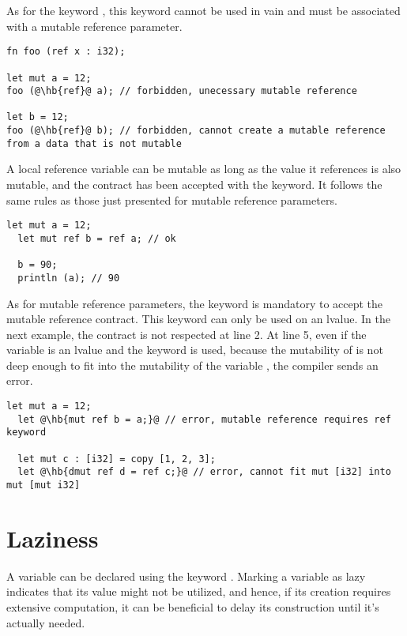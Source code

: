 As for the keyword , this keyword  cannot be used in
vain and must be associated with a mutable reference parameter.

\begin{lstlisting}[style=coloredverbatim, escapechar=@]
fn foo (ref x : i32);

let mut a = 12;
foo (@\hb{ref}@ a); // forbidden, unecessary mutable reference

let b = 12;
foo (@\hb{ref}@ b); // forbidden, cannot create a mutable reference from a data that is not mutable
\end{lstlisting}

A local reference variable can be mutable as long as the value it references is
also mutable, and the contract has been accepted with the  keyword.
It follows the same rules as those just presented for mutable reference
parameters.

\begin{lstlisting}[style=coloredverbatim, escapechar=@]
  let mut a = 12;
  let mut ref b = ref a; // ok

  b = 90;
  println (a); // 90
\end{lstlisting}

As for mutable reference parameters, the keyword  is mandatory to
accept the mutable reference contract. This keyword can only be used on an
lvalue. In the next example, the contract is not respected at line 2. At line 5,
even if the variable is an lvalue and the keyword  is used, because
the mutability of  is not deep enough to fit into the mutability of the
variable , the compiler sends an error.

\begin{lstlisting}[style=coloredverbatim, escapechar=@]
  let mut a = 12;
  let @\hb{mut ref b = a;}@ // error, mutable reference requires ref keyword

  let mut c : [i32] = copy [1, 2, 3];
  let @\hb{dmut ref d = ref c;}@ // error, cannot fit mut [i32] into mut [mut i32]
\end{lstlisting}

\vfill%
\pagebreak

\section{Laziness}
\label{sec:variable_laziness}

A variable can be declared using the keyword . Marking a variable as
lazy indicates that its value might not be utilized, and hence, if its creation
requires extensive computation, it can be beneficial to delay its construction
until it's actually needed.

